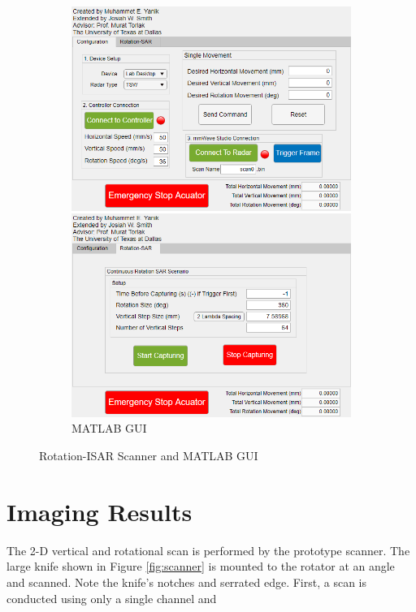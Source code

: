 \documentclass[conference]{IEEEtran}
\begin{document}
\begin{figure} [h]
\begin{subfigure}{.5\linewidth}
				\includegraphics[width=1\linewidth]{../Figures/MATLAB RSAR GUI 2}
				\caption{MATLAB GUI}
				\label{fig:matlab_gui}
			\end{subfigure}
			\caption{Rotation-ISAR Scanner and MATLAB GUI}
		\end{figure}
		
		
		\section{Imaging Results}
		\label{sec:imaging_results}
		The 2-D vertical and rotational scan is performed by the prototype scanner. The large knife shown in Figure \ref{fig:scanner} is mounted to the rotator at an angle and scanned. Note the knife's notches and serrated edge. First, a scan is conducted using only a single channel and 
		
\end{document}

